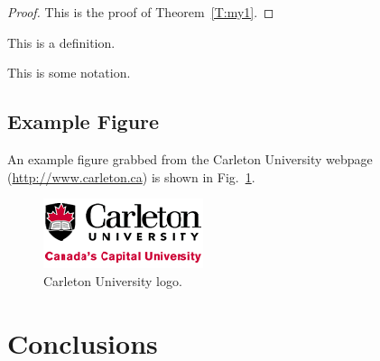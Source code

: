 \documentclass[12pt]{report}
\begin{document}
\begin{proof}
This is the proof of Theorem~\ref{T:my1}.
\end{proof}


\begin{definition}
This is a definition.
\end{definition}

\begin{notation}
This is some notation.
\end{notation}


\section{Example Figure}

An example figure grabbed from the Carleton University webpage (\url{http://www.carleton.ca}) is shown in Fig.~\ref{fig-culogo}.
  \begin{figure}[hbt]
   \begin{center}
     \includegraphics{cu_logo.png}
   \end{center}
  \caption{Carleton University logo.}
  \label{fig-culogo}
  \end{figure}
  





\chapter{Conclusions}
\end{document}
